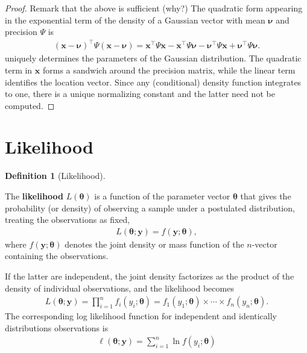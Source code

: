 \documentclass[
  11pt,
  letterpaper,
]{scrbook}
\theoremstyle{definition}
\theoremstyle{definition}
\theoremstyle{definition}
\newtheorem{definition}{Definition}[chapter]
\theoremstyle{plain}
\theoremstyle{plain}
\theoremstyle{remark}
\begin{document}
\begin{proof}
Remark that the above is sufficient (why?) The quadratic form appearing
in the exponential term of the density of a Gaussian vector with mean
\(\boldsymbol{\nu}\) and precision \(\boldsymbol{\varPsi}\) is
\begin{align*}
 (\boldsymbol{x}-\boldsymbol{\nu})^\top\boldsymbol{\varPsi}(\boldsymbol{x}-\boldsymbol{\nu})= \boldsymbol{x}^\top\boldsymbol{\varPsi}\boldsymbol{x} - \boldsymbol{x}^\top\boldsymbol{\varPsi}\boldsymbol{\nu} - 
\boldsymbol{\nu}^\top\boldsymbol{\varPsi}\boldsymbol{x} + \boldsymbol{\nu}^\top\boldsymbol{\varPsi}\boldsymbol{\nu}.
\end{align*} uniquely determines the parameters of the Gaussian
distribution. The quadratic term in \(\boldsymbol{x}\) forms a sandwich
around the precision matrix, while the linear term identifies the
location vector. Since any (conditional) density function integrates to
one, there is a unique normalizing constant and the latter need not be
computed.

\end{proof}

\section{Likelihood}\label{likelihood}

\begin{definition}[Likelihood]\protect\hypertarget{def-likelihood}{}\label{def-likelihood}

The \textbf{likelihood} \(L(\boldsymbol{\theta})\) is a function of the
parameter vector \(\boldsymbol{\theta}\) that gives the probability (or
density) of observing a sample under a postulated distribution, treating
the observations as fixed, \begin{align*}
L(\boldsymbol{\theta}; \boldsymbol{y}) = f(\boldsymbol{y}; \boldsymbol{\theta}),
\end{align*} where \(f(\boldsymbol{y}; \boldsymbol{\theta})\) denotes
the joint density or mass function of the \(n\)-vector containing the
observations.

If the latter are independent, the joint density factorizes as the
product of the density of individual observations, and the likelihood
becomes \begin{align*}
L(\boldsymbol{\theta}; \boldsymbol{y})=\prod_{i=1}^n f_i(y_i; \boldsymbol{\theta}) = f_1(y_1; \boldsymbol{\theta}) \times \cdots \times f_n(y_n; \boldsymbol{\theta}).
\end{align*} The corresponding log likelihood function for independent
and identically distributions observations is \begin{align*}
\ell(\boldsymbol{\theta}; \boldsymbol{y}) = \sum_{i=1}^n \ln f(y_i; \boldsymbol{\theta})
\end{align*}

\end{definition}
\end{document}
